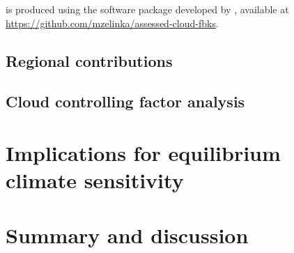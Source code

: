  is produced using the software package developed by \cite{Zelinka2021evaluating}, available at \url{https://github.com/mzelinka/assessed-cloud-fbks}.

\subsection{Regional contributions}
\label{sec:reg_contri_to_spread_of_cldfbk}

\subsection{Cloud controlling factor analysis}
\label{sec:cld_control_factor}


\section{Implications for equilibrium climate sensitivity}
\label{sec:implification_for_ECS}


\section{Summary and discussion}